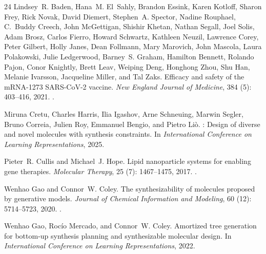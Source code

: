 \documentclass{article}
\begin{document}
\begin{thebibliography}{24}
Lindsey~R. Baden, Hana~M. El~Sahly, Brandon Essink, Karen Kotloff, Sharon Frey,
  Rick Novak, David Diemert, Stephen~A. Spector, Nadine Rouphael, C.~Buddy
  Creech, John McGettigan, Shishir Khetan, Nathan Segall, Joel Solis, Adam
  Brosz, Carlos Fierro, Howard Schwartz, Kathleen Neuzil, Lawrence Corey, Peter
  Gilbert, Holly Janes, Dean Follmann, Mary Marovich, John Mascola, Laura
  Polakowski, Julie Ledgerwood, Barney~S. Graham, Hamilton Bennett, Rolando
  Pajon, Conor Knightly, Brett Leav, Weiping Deng, Honghong Zhou, Shu Han,
  Melanie Ivarsson, Jacqueline Miller, and Tal Zaks.
\newblock Efficacy and safety of the {mRNA}-1273 {SARS}-{CoV}-2 vaccine.
\newblock \emph{New England Journal of Medicine}, 384 (5):
  403--416, 2021.
\newblock {}.

Miruna Cretu, Charles Harris, Ilia Igashov, Arne Schneuing, Marwin Segler,
  Bruno Correia, Julien Roy, Emmanuel Bengio, and Pietro Li\`{o}.
: Design of diverse and novel molecules with synthesis
  constraints.
\newblock In \emph{International Conference on Learning Representations}, 2025.

Pieter~R. Cullis and Michael~J. Hope.
\newblock Lipid nanoparticle systems for enabling gene therapies.
\newblock \emph{Molecular Therapy}, 25 (7): 1467--1475, 2017.
\newblock {}.

Wenhao Gao and Connor~W. Coley.
\newblock The synthesizability of molecules proposed by generative models.
\newblock \emph{Journal of Chemical Information and Modeling}, 60
  (12): 5714--5723, 2020.
\newblock {}.

Wenhao Gao, Roc\'{i}o Mercado, and Connor~W. Coley.
\newblock Amortized tree generation for bottom-up synthesis planning and
  synthesizable molecular design.
\newblock In \emph{International Conference on Learning Representations}, 2022.


\end{thebibliography}
\end{document}
